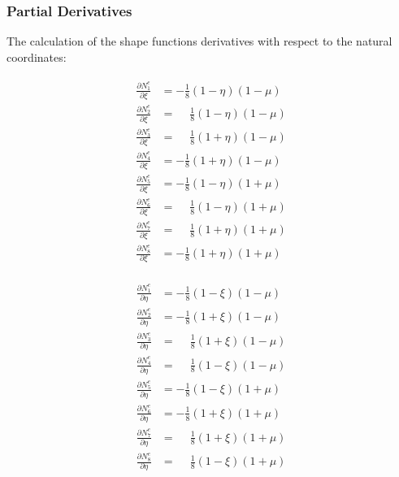 \documentclass[10pt,b5paper,titlepage]{book}
\newenvironment{eqarray}
{
    \begin{eqnarray}
        \begin{aligned}
}
{
        \end{aligned}
    \end{eqnarray}
}
\begin{document}
\subsubsection{Partial Derivatives}
The calculation of the shape functions derivatives with respect to the natural
coordinates:

\begin{eqarray}
    \frac{\partial N_1^e}{\partial\xi} &= -\frac{1}{8} \left(1-\eta\right) \left(1-\mu\right)\\
    \frac{\partial N_2^e}{\partial\xi} &= \phantom{-}\frac{1}{8} \left(1-\eta\right) \left(1-\mu\right)\\
    \frac{\partial N_3^e}{\partial\xi} &= \phantom{-}\frac{1}{8} \left(1+\eta\right) \left(1-\mu\right)\\
    \frac{\partial N_4^e}{\partial\xi} &= -\frac{1}{8} \left(1+\eta\right) \left(1-\mu\right)\\
    \frac{\partial N_5^e}{\partial\xi} &= -\frac{1}{8} \left(1-\eta\right) \left(1+\mu\right)\\
    \frac{\partial N_6^e}{\partial\xi} &= \phantom{-}\frac{1}{8} \left(1-\eta\right) \left(1+\mu\right)\\
    \frac{\partial N_7^e}{\partial\xi} &= \phantom{-}\frac{1}{8} \left(1+\eta\right) \left(1+\mu\right)\\
    \frac{\partial N_8^e}{\partial\xi} &= -\frac{1}{8} \left(1+\eta\right) \left(1+\mu\right)
\end{eqarray}

\begin{eqarray}
    \frac{\partial N_1^e}{\partial\eta} &= -\frac{1}{8} \left(1-\xi\right) \left(1-\mu\right)\\
    \frac{\partial N_2^e}{\partial\eta} &= -\frac{1}{8} \left(1+\xi\right) \left(1-\mu\right)\\
    \frac{\partial N_3^e}{\partial\eta} &= \phantom{-}\frac{1}{8} \left(1+\xi\right) \left(1-\mu\right)\\
    \frac{\partial N_4^e}{\partial\eta} &= \phantom{-}\frac{1}{8} \left(1-\xi\right) \left(1-\mu\right)\\
    \frac{\partial N_5^e}{\partial\eta} &= -\frac{1}{8} \left(1-\xi\right) \left(1+\mu\right)\\
    \frac{\partial N_6^e}{\partial\eta} &= -\frac{1}{8} \left(1+\xi\right) \left(1+\mu\right)\\
    \frac{\partial N_7^e}{\partial\eta} &= \phantom{-}\frac{1}{8} \left(1+\xi\right) \left(1+\mu\right)\\
    \frac{\partial N_8^e}{\partial\eta} &= \phantom{-}\frac{1}{8} \left(1-\xi\right) \left(1+\mu\right)
\end{eqarray}
\end{document}
